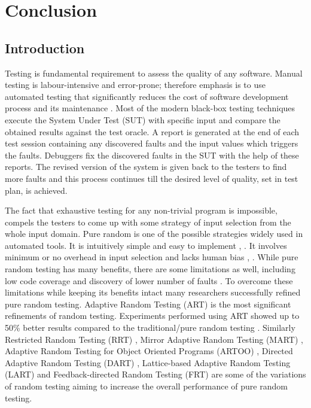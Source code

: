 \chapter{Conclusion}
\label{chap:conclusion}

\section{Introduction}\label{sec:intro7}

Testing is fundamental requirement to assess the quality of any software. Manual testing is labour-intensive and error-prone; therefore emphasis is to use automated testing that significantly reduces the cost of software development process and its maintenance \cite{beizer1995black}. Most of the modern black-box testing techniques execute the System Under Test (SUT) with specific input and compare the obtained results against the test oracle. A report is generated at the end of each test session containing any discovered faults and the input values which triggers the faults. Debuggers fix the discovered faults in the SUT with the help of these reports. The revised version of the system is given back to the testers to find more faults and this process continues till the desired level of quality, set in test plan, is achieved.

The fact that exhaustive testing for any non-trivial program is impossible, compels the testers to come up with some strategy of input selection from the whole input domain. Pure random is one of the possible strategies widely used in automated tools. It is intuitively simple and easy to implement \cite{Ciupa2008},  \cite{Forrester2000}. It involves minimum or no overhead in input selection and lacks human bias \cite{hamlet1994},  \cite{Linger1993}. While pure random testing has many benefits, there are some limitations as well, including low code coverage \cite{Offutt1996} and discovery of lower number of faults \cite{Chen1994}. To overcome these limitations while keeping its benefits intact many researchers successfully refined pure random testing. Adaptive Random Testing (ART) is the most significant refinements of random testing. Experiments performed using ART showed up to 50\% better results compared to the traditional/pure random testing  \cite{Chen2008}.  Similarly Restricted Random Testing (RRT) \cite{Chan2002}, Mirror Adaptive Random Testing (MART)  \cite{Chen2004}, Adaptive Random Testing for Object Oriented Programs (ARTOO) \cite{Ciupa2008}, Directed Adaptive Random Testing (DART)  \cite{Godefroid2005}, Lattice-based Adaptive Random Testing (LART) \cite{Mayer2005} and Feedback-directed Random Testing (FRT) \cite{Pacheco2007} are some of the variations of random testing aiming to increase the overall performance of pure random testing.

